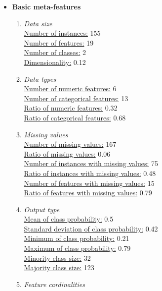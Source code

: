 \documentclass[10pt,a4paper]{article}
\begin{document}
	\begin{itemize}
		\item \textbf{Basic meta-features}\\
		\begin{enumerate}
			\item \textit{Data size} \\
			\underline{Number of instances:} 155 \\
			\underline{Number of features:} 19\\
			\underline{Number of classes:} 2\\
			\underline{Dimensionality:} 0.12\\
			\item \textit{Data types} \\
			\underline{Number of numeric features:} 6 \\
			\underline{Number of categorical features:} 13 \\
			\underline{Ratio of numeric features:} 0.32 \\
			\underline{Ratio of categorical features:} 0.68 \\
			\item \textit{Missing values} \\
			\underline{Number of missing values:} 167 \\
			\underline{Ratio of missing values:} 0.06 \\
			\underline{Number of instances with missing values:} 75 \\
			\underline{Ratio of instances with missing values:} 0.48 \\
			\underline{Number of features with missing values:} 15 \\
			\underline{Ratio of features with missing values:} 0.79 \\
			\item \textit{Output type} \\
			\underline{Mean of class probability:} 0.5 \\
			\underline{Standard deviation of class probability:} 0.42 \\
			\underline{Minimum of class probability:} 0.21 \\
			\underline{Maximum of class probability:} 0.79 \\
			\underline{Minority class size:} 32 \\
			\underline{Majority class size:} 123 \\					
			\item \textit{Feature cardinalities} \\

\end{enumerate}
\end{itemize}
\end{document}
